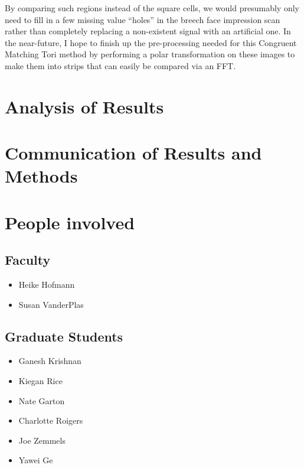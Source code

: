 \documentclass[]{book}
\providecommand{\tightlist}{%
  \setlength{\itemsep}{0pt}\setlength{\parskip}{0pt}}
\begin{document}
By comparing such regions instead of the square cells, we would presumably only need to fill in a few missing value ``holes'' in the breech face impression scan rather than completely replacing a non-existent signal with an artificial one. In the near-future, I hope to finish up the pre-processing needed for this Congruent Matching Tori method by performing a polar transformation on these images to make them into strips that can easily be compared via an FFT.

\hypertarget{analysis-of-results}{%
\section{Analysis of Results}\label{analysis-of-results}}

\hypertarget{communication-of-results-and-methods}{%
\section{Communication of Results and Methods}\label{communication-of-results-and-methods}}

\hypertarget{people-involved}{%
\section{People involved}\label{people-involved}}

\hypertarget{faculty}{%
\subsection{Faculty}\label{faculty}}

\begin{itemize}
\tightlist
\item
  Heike Hofmann
\item
  Susan VanderPlas
\end{itemize}

\hypertarget{graduate-students}{%
\subsection{Graduate Students}\label{graduate-students}}

\begin{itemize}
\tightlist
\item
  Ganesh Krishnan
\item
  Kiegan Rice
\item
  Nate Garton
\item
  Charlotte Roigers
\item
  Joe Zemmels
\item
  Yawei Ge
\end{itemize}
\end{document}
